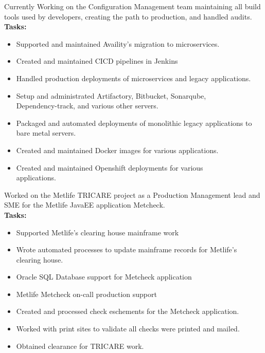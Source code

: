 \documentclass[10pt,a4paper,ragged2e,withhyper]{altacv}
\begin{document}
\begin{paracol}{2}

Currently Working on the Configuration Management team maintaining all build tools used by developers, creating the path to production, and handled audits.  \\

\smallskip
\textbf{Tasks:}
\begin{itemize}
\item Supported and maintained Availity's migration to microservices.
\item Created and maintained CICD pipelines in Jenkins
\item Handled production deployments of microservices and legacy applications.
\item Setup and administrated Artifactory, Bitbucket, Sonarqube, \\Dependency-track, and various other servers. 
\item Packaged and automated deployments of monolithic legacy applications to bare metal servers.
\item Created and maintained Docker images for various applications.
\item Created and maintained Openshift deployments for various \\applications.
\end{itemize}

\divider

  Worked on the Metlife TRICARE project as a Production Management lead and SME for the Metlife JavaEE application Metcheck. \\
\smallskip
\textbf{Tasks:}
\begin{itemize}
\item Supported Metlife's clearing house mainframe work
\item Wrote automated processes to update mainframe records for Metlife's clearing house. 
\item Oracle SQL Database support for Metcheck application
\item Metlife Metcheck on-call production support
\item Created and processed check eschements for the Metcheck application.
\item Worked with print sites to validate all checks were printed and mailed. 
\item Obtained clearance for TRICARE work.
\end{itemize}


\end{paracol}
\end{document}
